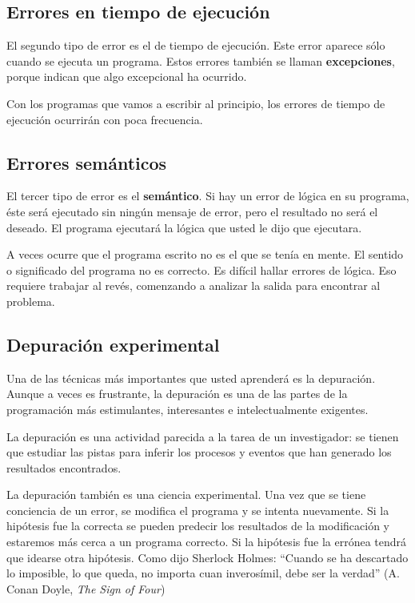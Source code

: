 \subsection{Errores en tiempo de ejecución}
\label{runtime}

El segundo tipo de error es el de tiempo de ejecución. Este
error aparece sólo cuando se ejecuta un programa. Estos errores
también se llaman {\bf excepciones}, porque indican que algo
excepcional ha ocurrido.

Con los programas que vamos a escribir al principio, los errores de
tiempo de ejecución ocurrirán con poca frecuencia.

\subsection{Errores semánticos}

El tercer tipo de error es el {\bf semántico}.
Si hay un error de lógica en su programa, éste será
ejecutado sin ningún mensaje de error, pero el resultado no
será el deseado. El programa ejecutará la lógica que usted
le dijo que ejecutara.

A veces ocurre que el programa escrito no es el que se
tenía en mente. El sentido o significado del programa no es
correcto. Es difícil hallar errores de lógica. Eso requiere
trabajar al revés, comenzando a analizar la salida para
encontrar al problema.

\subsection{Depuración experimental}

Una de las técnicas más importantes que usted aprenderá es la
depuración. Aunque a veces es frustrante, la depuración es una
de las partes de la programación más estimulantes, interesantes e 
intelectualmente exigentes.


La depuración es una actividad parecida a la tarea de un
investigador: se tienen que estudiar las pistas para inferir los
procesos y eventos que han generado los resultados encontrados.

La depuración también es una ciencia experimental. Una vez
que se tiene conciencia de un error, se modifica el programa y se intenta
nuevamente. Si la hipótesis fue la correcta se pueden predecir los
resultados de la modificación y estaremos más cerca a un programa
correcto. Si la hipótesis fue la errónea tendrá que idearse otra
hipótesis. Como dijo Sherlock Holmes: ``Cuando se ha descartado lo
imposible, lo que queda, no importa cuan inverosímil, debe ser la
verdad'' (A. Conan Doyle, {\em The Sign of Four})

